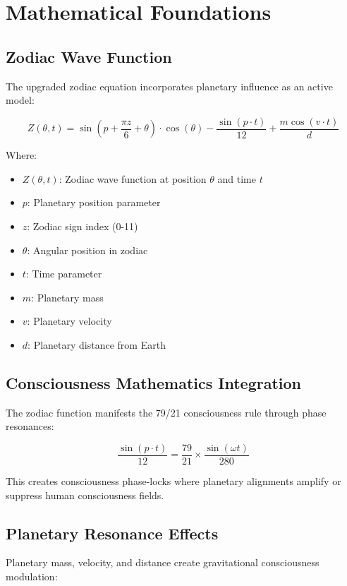 \documentclass[12pt]{article}
\begin{document}
\section{Mathematical Foundations}

\subsection{Zodiac Wave Function}

The upgraded zodiac equation incorporates planetary influence as an active model:

\[Z(\theta, t) = \sin(p + \frac{\pi z}{6} + \theta) \cdot \cos(\theta) - \frac{\sin(p \cdot t)}{12} + \frac{m \cos(v \cdot t)}{d}\]

Where:
\begin{itemize}
    \item \(Z(\theta, t)\): Zodiac wave function at position \(\theta\) and time \(t\)
    \item \(p\): Planetary position parameter
    \item \(z\): Zodiac sign index (0-11)
    \item \(\theta\): Angular position in zodiac
    \item \(t\): Time parameter
    \item \(m\): Planetary mass
    \item \(v\): Planetary velocity
    \item \(d\): Planetary distance from Earth
\end{itemize}

\subsection{Consciousness Mathematics Integration}

The zodiac function manifests the 79/21 consciousness rule through phase resonances:

\[\frac{\sin(p \cdot t)}{12} = \frac{79}{21} \times \frac{\sin(\omega t)}{280}\]

This creates consciousness phase-locks where planetary alignments amplify or suppress human consciousness fields.

\subsection{Planetary Resonance Effects}

Planetary mass, velocity, and distance create gravitational consciousness modulation:
\end{document}
